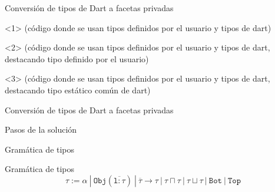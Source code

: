 \documentclass[aspectratio=169,10pt]{beamer}
\begin{document}
\begin{frame}[fragile]{Conversión de tipos de Dart a facetas privadas}
	\begin{onlyenv}
		(código donde se usan tipos definidos por el usuario y tipos de dart)
	\end{onlyenv}
	\begin{onlyenv}
		(código donde se usan tipos definidos por el usuario y tipos de dart, destacando tipo definido por el usuario)
	\end{onlyenv}
	\begin{onlyenv}
		(código donde se usan tipos definidos por el usuario y tipos de dart, destacando tipo estático común de dart)
	\end{onlyenv}
\end{frame}

\begin{frame}[fragile]{Conversión de tipos de Dart a facetas privadas}
	\\
	\only<2>{$P_{Bi}$ (algo)}
	\only<3>{$P_{Ai}$ (algo)}

\end{frame}

\begin{frame}[fragile]{Pasos de la solución}
\end{frame}

\begin{frame}[fragile]{Gramática de tipos}
	\begin{block}{Gramática de tipos}
		\[\mathtt{\tau := \alpha\ |\ Obj(\overline{l: \tau})\ |\ \overline{\tau} \rightarrow \tau \ |\ \tau \sqcap \tau\ |\ \tau \sqcup \tau\ |\ Bot\ |\ Top}\]
	\end{block}
\end{frame}
\end{document}
